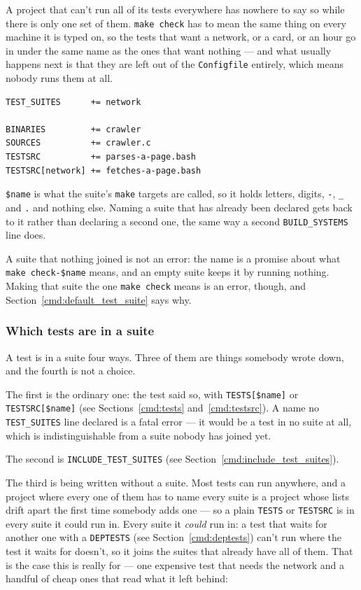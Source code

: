 \documentclass{article}
\begin{document}
A project that can't run all of its tests everywhere has nowhere to
say so while there is only one set of them.  \texttt{make check} has
to mean the same thing on every machine it is typed on, so the tests
that want a network, or a card, or an hour go in under the same name
as the ones that want nothing --- and what usually happens next is
that they are left out of the \texttt{Configfile} entirely, which
means nobody runs them at all.

\begin{verbatim}
TEST_SUITES      += network

BINARIES         += crawler
SOURCES          += crawler.c
TESTSRC          += parses-a-page.bash
TESTSRC[network] += fetches-a-page.bash
\end{verbatim}

\texttt{\$name} is what the suite's \texttt{make} targets are called,
so it holds letters, digits, \texttt{-}, \texttt{\_} and \texttt{.}
and nothing else.  Naming a suite that has already been declared gets
back to it rather than declaring a second one, the same way a second
\texttt{BUILD\_SYSTEMS} line does.

A suite that nothing joined is not an error: the name is a promise
about what \texttt{make check-\$name} means, and an empty suite keeps
it by running nothing.  Making that suite the one \texttt{make check}
means is an error, though, and Section~\ref{cmd:default_test_suite}
says why.

\subsubsection{Which tests are in a suite}

A test is in a suite four ways.  Three of them are things somebody
wrote down, and the fourth is not a choice.

The first is the ordinary one: the test said so, with
\texttt{TESTS[\$name]} or \texttt{TESTSRC[\$name]} (see
Sections~\ref{cmd:tests} and~\ref{cmd:testsrc}).  A name no
\texttt{TEST\_SUITES} line declared is a fatal error --- it would be a
test in no suite at all, which is indistinguishable from a suite
nobody has joined yet.

The second is \texttt{INCLUDE\_TEST\_SUITES} (see
Section~\ref{cmd:include_test_suites}).

The third is being written without a suite.  Most tests can run
anywhere, and a project where every one of them has to name every
suite is a project whose lists drift apart the first time somebody
adds one --- so a plain \texttt{TESTS} or \texttt{TESTSRC} is in
every suite it could run in.  Every suite it \textit{could} run in:
a test that waits for another one with a \texttt{DEPTESTS} (see
Section~\ref{cmd:deptests}) can't run where the test it waits for
doesn't, so it joins the suites that already have all of them.  That
is the case this is really for --- one expensive test that needs the
network and a handful of cheap ones that read what it left behind:
\end{document}
